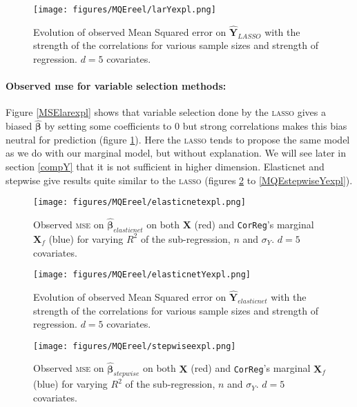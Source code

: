 \documentclass[12pt,a4paper]{report}
\begin{document}
	 \begin{figure}
	 \centering
	  \texttt{[image: figures/MQEreel/larYexpl.png]}
	  \caption{Evolution of observed Mean Squared error on $\hat{\boldsymbol{Y}}_{LASSO}$ with the strength of the correlations for various sample sizes and strength of regression. $d=5$ covariates. } \label{MQElarYexpl}
	\end{figure}
	
		\paragraph{Observed {\sc mse} for variable selection methods:}
	Figure \ref{MSElarexpl} shows that variable selection done by the \textsc{lasso} gives a biased $\hat{\boldsymbol{\beta}}$ by setting some coefficients to 0 but strong correlations makes this bias neutral for prediction (figure \ref{MQElarYexpl}). Here the \textsc{lasso} tends to propose the same model as we do  with our marginal model, but without explanation. We will see  later in section \ref{compY} that it is not sufficient in higher dimension. Elasticnet and stepwise give results quite similar to the \textsc{lasso} (figures \ref{MSEelasticnetexpl} to \ref{MQEstepwiseYexpl}). \\

	\begin{figure}[h!]
	\texttt{[image: figures/MQEreel/elasticnetexpl.png]}
	\caption{Observed \textsc{mse} on $\hat{\boldsymbol{\beta}}_{elasticnet}$ on both $\boldsymbol{X}$ (red) and {\tt CorReg}'s marginal $\boldsymbol{X}_f$ (blue) for varying $R^2$ of the sub-regression, $n$ and $\sigma_Y$. $d=5$ covariates.}\label{MSEelasticnetexpl}
\end{figure} 
	
	 \begin{figure}
	 \centering
	  \texttt{[image: figures/MQEreel/elasticnetYexpl.png]}
	  \caption{Evolution of observed Mean Squared error on $\hat{\boldsymbol{Y}}_{elasticnet}$ with the strength of the correlations for various sample sizes and strength of regression. $d=5$ covariates. } \label{MQEelasticnetYexpl}
	\end{figure}
	\begin{figure}[h!]
	\texttt{[image: figures/MQEreel/stepwiseexpl.png]}\label{MSEstepwiseexpl}
	\caption{Observed \textsc{mse} on $\hat{\boldsymbol{\beta}}_{stepwise}$ on both $\boldsymbol{X}$ (red) and {\tt CorReg}'s marginal $\boldsymbol{X}_f$ (blue) for varying $R^2$ of the sub-regression, $n$ and $\sigma_Y$. $d=5$ covariates.}
\end{figure} 
	
\end{document}
